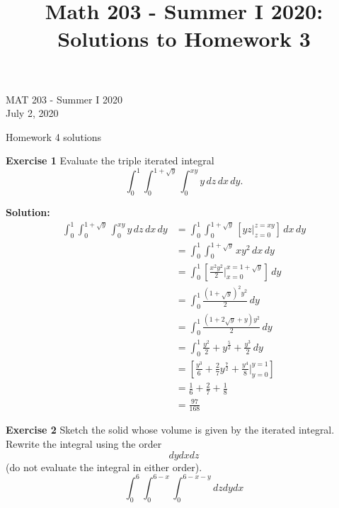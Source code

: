 \documentclass[12pt,oneside]{exam}
\title{Math 203 - Summer I 2020: Solutions to Homework 3}
\newenvironment{exercise}[1]{\vspace{.1in}\noindent\textbf{Exercise #1 \hspace{.05em}}}{}
\newenvironment{newsolution}{\vspace{.1in}\noindent\textbf{Solution: \hspace{.05em}}}{}
\begin{document}
\begin{flushright}
\sc MAT 203 - Summer I 2020\\
July 2, 2020
\end{flushright}
\bigskip
 
\begin{center}
\textsf{Homework 4 solutions} 
\end{center}


\begin{exercise}{1}
Evaluate the triple iterated integral
\begin{equation*}
\int_{0}^{1}\int_{0}^{1+\sqrt{y}}\int_{0}^{xy} y \, dz \, dx \, dy.
\end{equation*}
\end{exercise}

\begin{newsolution} 
\begin{align*}
\int_{0}^{1} \int_{0}^{1+\sqrt{y}} \int_{0}^{xy} y \, dz \, dx \, dy & = \int_{0}^{1} \int_{0}^{1+\sqrt{y}} \left[ yz\Big|_{z=0}^{z=xy} \right] \, dx\, dy \\
& = \int_{0}^{1} \int_{0}^{1+\sqrt{y}} xy^2 \, dx \, dy \\
& = \int_{0}^{1} \left[ \frac{x^2y^2}{2} \Big|_{x=0}^{x=1+\sqrt{y}} \right] \, dy \\
& = \int_{0}^{1} \frac{(1+\sqrt{y})^2 y^2}{2} \, dy \\
& = \int_{0}^{1} \frac{(1+2\sqrt{y}+y) y^2}{2} \, dy \\
& = \int_{0}^{1} \frac{y^2}{2} + y^{\frac{5}{2}} + \frac{y^3}{2} \, dy \\
& = \left[ \frac{y^3}{6} + \frac{2}{7}y^{\frac{7}{2}} + \frac{y^4}{8} \Big|_{y=0}^{y=1} \right] \\
& = \frac{1}{6} + \frac{2}{7} + \frac{1}{8} \\
& = \frac{97}{168}
\end{align*}
\end{newsolution}

\begin{exercise}{2}
Sketch the solid whose volume is given by the iterated integral. Rewrite the integral using the order $$dy dx dz$$ (do not evaluate the integral in either order). 
\begin{equation*}
\int_{0}^{6} \int_{0}^{6-x} \int_{0}^{6-x-y} dz dy dx
\end{equation*}
\end{exercise}
\end{document}

